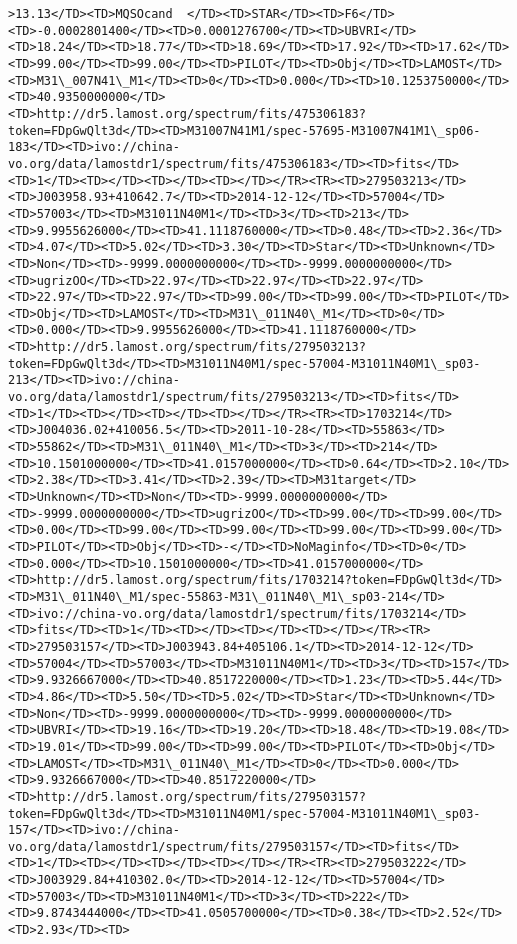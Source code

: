 \documentclass[11pt]{article}
\begin{document}
\begin{Verbatim}[commandchars=\\\{\}]
>13.13</TD><TD>MQSOcand  </TD><TD>STAR</TD><TD>F6</TD><TD>-0.0002801400</TD><TD>0.0001276700</TD><TD>UBVRI</TD><TD>18.24</TD><TD>18.77</TD><TD>18.69</TD><TD>17.92</TD><TD>17.62</TD><TD>99.00</TD><TD>99.00</TD><TD>PILOT</TD><TD>Obj</TD><TD>LAMOST</TD><TD>M31\_007N41\_M1</TD><TD>0</TD><TD>0.000</TD><TD>10.1253750000</TD><TD>40.9350000000</TD><TD>http://dr5.lamost.org/spectrum/fits/475306183?token=FDpGwQlt3d</TD><TD>M31007N41M1/spec-57695-M31007N41M1\_sp06-183</TD><TD>ivo://china-vo.org/data/lamostdr1/spectrum/fits/475306183</TD><TD>fits</TD><TD>1</TD><TD></TD><TD></TD><TD></TD></TR><TR><TD>279503213</TD><TD>J003958.93+410642.7</TD><TD>2014-12-12</TD><TD>57004</TD><TD>57003</TD><TD>M31011N40M1</TD><TD>3</TD><TD>213</TD><TD>9.9955626000</TD><TD>41.1118760000</TD><TD>0.48</TD><TD>2.36</TD><TD>4.07</TD><TD>5.02</TD><TD>3.30</TD><TD>Star</TD><TD>Unknown</TD><TD>Non</TD><TD>-9999.0000000000</TD><TD>-9999.0000000000</TD><TD>ugrizOO</TD><TD>22.97</TD><TD>22.97</TD><TD>22.97</TD><TD>22.97</TD><TD>22.97</TD><TD>99.00</TD><TD>99.00</TD><TD>PILOT</TD><TD>Obj</TD><TD>LAMOST</TD><TD>M31\_011N40\_M1</TD><TD>0</TD><TD>0.000</TD><TD>9.9955626000</TD><TD>41.1118760000</TD><TD>http://dr5.lamost.org/spectrum/fits/279503213?token=FDpGwQlt3d</TD><TD>M31011N40M1/spec-57004-M31011N40M1\_sp03-213</TD><TD>ivo://china-vo.org/data/lamostdr1/spectrum/fits/279503213</TD><TD>fits</TD><TD>1</TD><TD></TD><TD></TD><TD></TD></TR><TR><TD>1703214</TD><TD>J004036.02+410056.5</TD><TD>2011-10-28</TD><TD>55863</TD><TD>55862</TD><TD>M31\_011N40\_M1</TD><TD>3</TD><TD>214</TD><TD>10.1501000000</TD><TD>41.0157000000</TD><TD>0.64</TD><TD>2.10</TD><TD>2.38</TD><TD>3.41</TD><TD>2.39</TD><TD>M31target</TD><TD>Unknown</TD><TD>Non</TD><TD>-9999.0000000000</TD><TD>-9999.0000000000</TD><TD>ugrizOO</TD><TD>99.00</TD><TD>99.00</TD><TD>0.00</TD><TD>99.00</TD><TD>99.00</TD><TD>99.00</TD><TD>99.00</TD><TD>PILOT</TD><TD>Obj</TD><TD>-</TD><TD>NoMaginfo</TD><TD>0</TD><TD>0.000</TD><TD>10.1501000000</TD><TD>41.0157000000</TD><TD>http://dr5.lamost.org/spectrum/fits/1703214?token=FDpGwQlt3d</TD><TD>M31\_011N40\_M1/spec-55863-M31\_011N40\_M1\_sp03-214</TD><TD>ivo://china-vo.org/data/lamostdr1/spectrum/fits/1703214</TD><TD>fits</TD><TD>1</TD><TD></TD><TD></TD><TD></TD></TR><TR><TD>279503157</TD><TD>J003943.84+405106.1</TD><TD>2014-12-12</TD><TD>57004</TD><TD>57003</TD><TD>M31011N40M1</TD><TD>3</TD><TD>157</TD><TD>9.9326667000</TD><TD>40.8517220000</TD><TD>1.23</TD><TD>5.44</TD><TD>4.86</TD><TD>5.50</TD><TD>5.02</TD><TD>Star</TD><TD>Unknown</TD><TD>Non</TD><TD>-9999.0000000000</TD><TD>-9999.0000000000</TD><TD>UBVRI</TD><TD>19.16</TD><TD>19.20</TD><TD>18.48</TD><TD>19.08</TD><TD>19.01</TD><TD>99.00</TD><TD>99.00</TD><TD>PILOT</TD><TD>Obj</TD><TD>LAMOST</TD><TD>M31\_011N40\_M1</TD><TD>0</TD><TD>0.000</TD><TD>9.9326667000</TD><TD>40.8517220000</TD><TD>http://dr5.lamost.org/spectrum/fits/279503157?token=FDpGwQlt3d</TD><TD>M31011N40M1/spec-57004-M31011N40M1\_sp03-157</TD><TD>ivo://china-vo.org/data/lamostdr1/spectrum/fits/279503157</TD><TD>fits</TD><TD>1</TD><TD></TD><TD></TD><TD></TD></TR><TR><TD>279503222</TD><TD>J003929.84+410302.0</TD><TD>2014-12-12</TD><TD>57004</TD><TD>57003</TD><TD>M31011N40M1</TD><TD>3</TD><TD>222</TD><TD>9.8743444000</TD><TD>41.0505700000</TD><TD>0.38</TD><TD>2.52</TD><TD>2.93</TD><TD>
\end{Verbatim}
\end{document}
